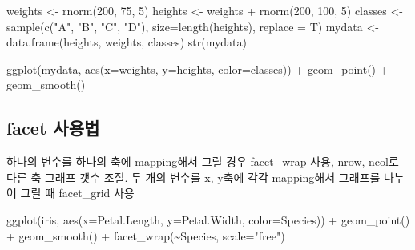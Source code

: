 \documentclass[
]{book}
\newenvironment{Shaded}{\begin{snugshade}}{\end{snugshade}}
\newcommand{\AttributeTok}[1]{\textcolor[rgb]{0.77,0.63,0.00}{#1}}
\newcommand{\DecValTok}[1]{\textcolor[rgb]{0.00,0.00,0.81}{#1}}
\newcommand{\FunctionTok}[1]{\textcolor[rgb]{0.00,0.00,0.00}{#1}}
\newcommand{\NormalTok}[1]{#1}
\newcommand{\OtherTok}[1]{\textcolor[rgb]{0.56,0.35,0.01}{#1}}
\newcommand{\SpecialCharTok}[1]{\textcolor[rgb]{0.00,0.00,0.00}{#1}}
\newcommand{\StringTok}[1]{\textcolor[rgb]{0.31,0.60,0.02}{#1}}
\begin{document}
\begin{Shaded}
\begin{Highlighting}[]
\NormalTok{weights }\OtherTok{\textless{}{-}} \FunctionTok{rnorm}\NormalTok{(}\DecValTok{200}\NormalTok{, }\DecValTok{75}\NormalTok{, }\DecValTok{5}\NormalTok{)}
\NormalTok{heights }\OtherTok{\textless{}{-}}\NormalTok{ weights }\SpecialCharTok{+} \FunctionTok{rnorm}\NormalTok{(}\DecValTok{200}\NormalTok{, }\DecValTok{100}\NormalTok{, }\DecValTok{5}\NormalTok{)}
\NormalTok{classes }\OtherTok{\textless{}{-}} \FunctionTok{sample}\NormalTok{(}\FunctionTok{c}\NormalTok{(}\StringTok{"A"}\NormalTok{, }\StringTok{"B"}\NormalTok{, }\StringTok{"C"}\NormalTok{, }\StringTok{"D"}\NormalTok{), }\AttributeTok{size=}\FunctionTok{length}\NormalTok{(heights), }\AttributeTok{replace =}\NormalTok{ T)}
\NormalTok{mydata }\OtherTok{\textless{}{-}} \FunctionTok{data.frame}\NormalTok{(heights, weights, classes)}
\FunctionTok{str}\NormalTok{(mydata)}

\FunctionTok{ggplot}\NormalTok{(mydata, }\FunctionTok{aes}\NormalTok{(}\AttributeTok{x=}\NormalTok{weights, }\AttributeTok{y=}\NormalTok{heights, }\AttributeTok{color=}\NormalTok{classes)) }\SpecialCharTok{+}
  \FunctionTok{geom\_point}\NormalTok{() }\SpecialCharTok{+}
  \FunctionTok{geom\_smooth}\NormalTok{()}
\end{Highlighting}
\end{Shaded}

\hypertarget{facet-uxc0acuxc6a9uxbc95}{%
\subsection{facet 사용법}\label{facet-uxc0acuxc6a9uxbc95}}

하나의 변수를 하나의 축에 mapping해서 그릴 경우 facet\_wrap 사용, nrow, ncol로 다른 축 그래프 갯수 조절. 두 개의 변수를 x, y축에 각각 mapping해서 그래프를 나누어 그릴 때 facet\_grid 사용

\begin{Shaded}
\begin{Highlighting}[]
\FunctionTok{ggplot}\NormalTok{(iris, }
       \FunctionTok{aes}\NormalTok{(}\AttributeTok{x=}\NormalTok{Petal.Length, }
           \AttributeTok{y=}\NormalTok{Petal.Width,}
           \AttributeTok{color=}\NormalTok{Species)) }\SpecialCharTok{+}
  \FunctionTok{geom\_point}\NormalTok{() }\SpecialCharTok{+}
  \FunctionTok{geom\_smooth}\NormalTok{() }\SpecialCharTok{+}
  \FunctionTok{facet\_wrap}\NormalTok{(}\SpecialCharTok{\textasciitilde{}}\NormalTok{Species, }\AttributeTok{scale=}\StringTok{"free"}\NormalTok{)}
\end{Highlighting}
\end{Shaded}
\end{document}
